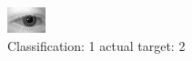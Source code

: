 \begin{figure}[h!]
\begin{center}
\includegraphics[width=0.60\columnwidth]{figures/ID480_class_1_target_2.png}
\end{center}
\caption{ Classification: 1 actual target: 2}
\label{fig:ID480_class_1_target_2}
\end{figure}
